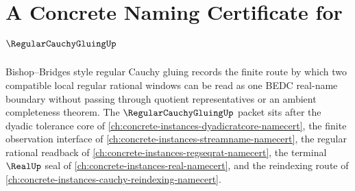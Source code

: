 \chapter{A Concrete Naming Certificate for $\RegularCauchyGluingUp$}
\label{ch:concrete-instances-regular-cauchy-gluing-namecert}

Bishop--Bridges style regular Cauchy gluing records the finite route by which two compatible local regular rational windows can be read as one BEDC real-name boundary without passing through quotient representatives or an ambient completeness theorem. The $\RegularCauchyGluingUp$ packet sits after the dyadic tolerance core of \autoref{ch:concrete-instances-dyadicratcore-namecert}, the finite observation interface of \autoref{ch:concrete-instances-streamname-namecert}, the regular rational readback of \autoref{ch:concrete-instances-regseqrat-namecert}, the terminal $\RealUp$ seal of \autoref{ch:concrete-instances-real-namecert}, and the reindexing route of \autoref{ch:concrete-instances-cauchy-reindexing-namecert}.


